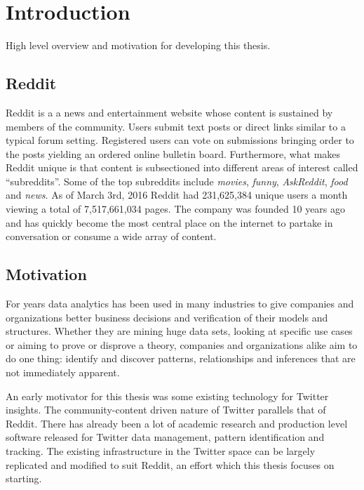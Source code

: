 \documentclass[msc,oneside]{ubcthesis}%
\begin{document}

\mainmatter\setlength{\parskip}{1em}


\chapter{Introduction}
High level overview and motivation for developing this thesis.

\section{Reddit}
Reddit is a a news and entertainment website whose content is sustained by members of the community. Users submit text posts or direct links similar to a typical forum setting. Registered users can vote on submissions bringing order to the posts yielding an ordered online bulletin board. Furthermore, what makes Reddit unique is that content is subsectioned into different areas of interest called ``subreddits''. Some of the top subreddits include \textit{movies}, \textit{funny}, \textit{AskReddit}, \textit{food} and \textit{news}. As of March 3rd, 2016 Reddit had 231,625,384 unique users a month viewing a total of 7,517,661,034 pages. The company was founded 10 years ago and has quickly become the most central place on the internet to partake in conversation or consume a wide array of content.

\section{Motivation}
For years data analytics has been used in many industries to give companies and organizations better business decisions and verification of their models and structures. Whether they are mining huge data sets, looking at specific use cases or aiming to prove or disprove a theory, companies and organizations alike aim to do one thing: identify and discover patterns, relationships and inferences that are not immediately apparent.
\par
An early motivator for this thesis was some existing technology for Twitter insights. The community-content driven nature of Twitter parallels that of Reddit. There has already been a lot of academic research and production level software released for Twitter data management, pattern identification and tracking. The existing infrastructure in the Twitter space can be largely replicated and modified to suit Reddit, an effort which this thesis focuses on starting.
\end{document}
